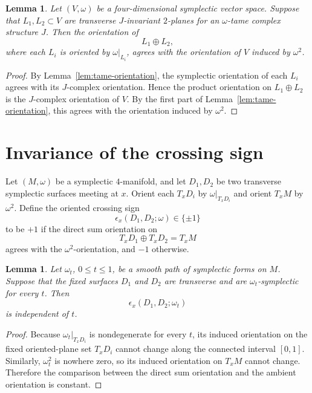 \documentclass[11pt]{article}
\newtheorem{lemma}[theorem]{Lemma}
\theoremstyle{definition}
\theoremstyle{remark}
\begin{document}
\begin{lemma}\label{lem:positive-crossing}
Let $(V,\omega)$ be a four-dimensional symplectic vector space. Suppose that
$L_1,L_2\subset V$ are transverse $J$-invariant $2$-planes for an
$\omega$-tame complex structure $J$. Then the orientation of
\[
L_1\oplus L_2,
\]
where each $L_i$ is oriented by $\omega|_{L_i}$, agrees with the orientation
of $V$ induced by $\omega^2$.
\end{lemma}

\begin{proof}
By Lemma~\ref{lem:tame-orientation}, the symplectic orientation of each
$L_i$ agrees with its $J$-complex orientation. Hence the product orientation
on $L_1\oplus L_2$ is the $J$-complex orientation of $V$. By the first part
of Lemma~\ref{lem:tame-orientation}, this agrees with the orientation
induced by $\omega^2$.
\end{proof}

\section{Invariance of the crossing sign}

Let $(M,\omega)$ be a symplectic $4$-manifold, and let $D_1,D_2$ be two
transverse symplectic surfaces meeting at $x$. Orient each $T_xD_i$ by
$\omega|_{T_xD_i}$ and orient $T_xM$ by $\omega^2$. Define the oriented
crossing sign
\[
\epsilon_x(D_1,D_2;\omega)\in\{\pm1\}
\]
to be $+1$ if the direct sum orientation on
\[
T_xD_1\oplus T_xD_2=T_xM
\]
agrees with the $\omega^2$-orientation, and $-1$ otherwise.

\begin{lemma}\label{lem:homotopy-invariance}
Let $\omega_t$, $0\le t\le1$, be a smooth path of symplectic forms on $M$.
Suppose that the fixed surfaces $D_1$ and $D_2$ are transverse and are
$\omega_t$-symplectic for every $t$. Then
\[
\epsilon_x(D_1,D_2;\omega_t)
\]
is independent of $t$.
\end{lemma}

\begin{proof}
Because $\omega_t|_{T_xD_i}$ is nondegenerate for every $t$, its induced
orientation on the fixed oriented-plane set $T_xD_i$ cannot change along the
connected interval $[0,1]$. Similarly, $\omega_t^2$ is nowhere zero, so its
induced orientation on $T_xM$ cannot change. Therefore the comparison
between the direct sum orientation and the ambient orientation is constant.
\end{proof}
\end{document}
